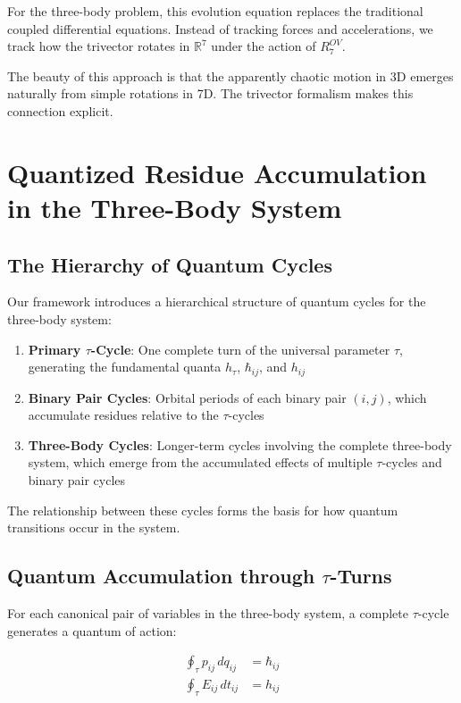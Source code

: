 \documentclass{article}
\begin{document}
For the three-body problem, this evolution equation replaces the traditional coupled differential equations. Instead of tracking forces and accelerations, we track how the trivector rotates in $\mathbb{R}^7$ under the action of $R^{OV}_7$.

The beauty of this approach is that the apparently chaotic motion in 3D emerges naturally from simple rotations in 7D. The trivector formalism makes this connection explicit.

\section{Quantized Residue Accumulation in the Three-Body System}

\subsection{The Hierarchy of Quantum Cycles}

Our framework introduces a hierarchical structure of quantum cycles for the three-body system:

\begin{enumerate}
\item \textbf{Primary $\tau$-Cycle}: One complete turn of the universal parameter $\tau$, generating the fundamental quanta $h_\tau$, $\hbar_{ij}$, and $h_{ij}$
\item \textbf{Binary Pair Cycles}: Orbital periods of each binary pair $(i,j)$, which accumulate residues relative to the $\tau$-cycles
\item \textbf{Three-Body Cycles}: Longer-term cycles involving the complete three-body system, which emerge from the accumulated effects of multiple $\tau$-cycles and binary pair cycles
\end{enumerate}

The relationship between these cycles forms the basis for how quantum transitions occur in the system.

\subsection{Quantum Accumulation through $\tau$-Turns}

For each canonical pair of variables in the three-body system, a complete $\tau$-cycle generates a quantum of action:

\begin{align}
\oint_\tau p_{ij} \, dq_{ij} &= \hbar_{ij} \\
\oint_\tau E_{ij} \, dt_{ij} &= h_{ij}
\end{align}
\end{document}
